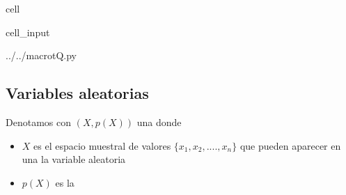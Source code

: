 \documentclass[letterpaper,10pt,english]{jupyterBook}
\begin{document}
\begin{sphinxuseclass}{cell}\begin{sphinxVerbatimInput}

\begin{sphinxuseclass}{cell_input}
\begin{sphinxVerbatim}[commandchars=\\\{\}]
 ../../macro\PYGZus{}tQ.py
 
   

   
   
   
   
   
  
\end{sphinxVerbatim}

\end{sphinxuseclass}\end{sphinxVerbatimInput}

\end{sphinxuseclass}

\subsection{Variables aleatorias}
\label{\detokenize{docs/Part_01_Formalismo/Chapter_01_02_Formalismo_matem_xe1tico/01_05_Probabilidades_myst:variables-aleatorias}}
\sphinxAtStartPar
Denotamos con \((X,p(X))\) una   donde
\begin{itemize}
\item {} 
\sphinxAtStartPar
\(X\) es el espacio muestral de valores \(\{x_1, x_2,....,x_n\}\) que pueden aparecer en una  la variable aleatoria

\item {} 
\sphinxAtStartPar
\(p(X)\) es la 

\end{itemize}
\end{document}
